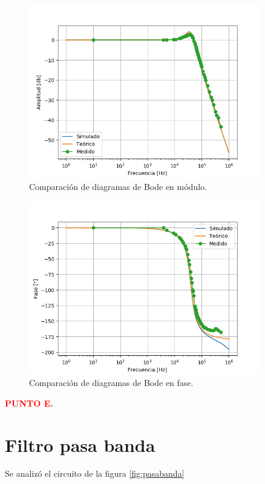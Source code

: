 \begin{figure}[H]
	\centering
	\includegraphics[width=0.9\textwidth]{Ejercicio2/Mediciones/Modulo.png}
\caption{Comparación de diagramas de Bode en módulo.}
	\label{fig:bodemod}
\end{figure}
\begin{figure}[H]
	\centering
	\includegraphics[width=0.9\textwidth]{Ejercicio2/Mediciones/Fase.png}
\caption{Comparación de diagramas de Bode en fase.}
	\label{fig:bodefase}
\end{figure}

\begin{center}
	\textcolor{red}{\textbf{PUNTO E.}}
\end{center}
\section{Filtro pasa banda}
Se analizó el circuito de la figura \ref{fig:pasabanda}

